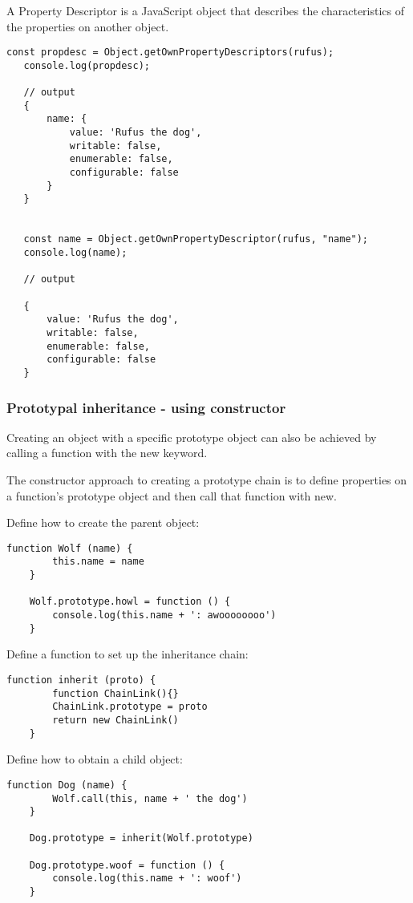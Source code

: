 \documentclass{scrartcl}
\begin{document}
A Property Descriptor is a JavaScript object that describes the characteristics of the properties on another object.

\begin{lstlisting}[style=ES6]
   const propdesc = Object.getOwnPropertyDescriptors(rufus);
   console.log(propdesc);

   // output
   {
       name: {
           value: 'Rufus the dog',
           writable: false,
           enumerable: false,
           configurable: false
       }
   }


   const name = Object.getOwnPropertyDescriptor(rufus, "name");
   console.log(name);

   // output

   {
       value: 'Rufus the dog',
       writable: false,
       enumerable: false,
       configurable: false
   }

\end{lstlisting}

\subsubsection{Prototypal inheritance - using constructor}

Creating an object with a specific prototype object can also be achieved by calling a function with the new keyword.

The constructor approach to creating a prototype chain is to define properties on a function's prototype object and then call that function with new.

Define how to create the parent object:

\begin{lstlisting}[style=ES6]
    function Wolf (name) {
        this.name = name
    }

    Wolf.prototype.howl = function () {
        console.log(this.name + ': awoooooooo')
    }
\end{lstlisting}

Define a function to set up the inheritance chain:

\begin{lstlisting}[style=ES6]
    function inherit (proto) {
        function ChainLink(){}
        ChainLink.prototype = proto
        return new ChainLink()
    }
\end{lstlisting}

Define how to obtain a child object:

\begin{lstlisting}[style=ES6]
    function Dog (name) {
        Wolf.call(this, name + ' the dog')
    }

    Dog.prototype = inherit(Wolf.prototype)

    Dog.prototype.woof = function () {
        console.log(this.name + ': woof')
    }

\end{lstlisting}
\end{document}
